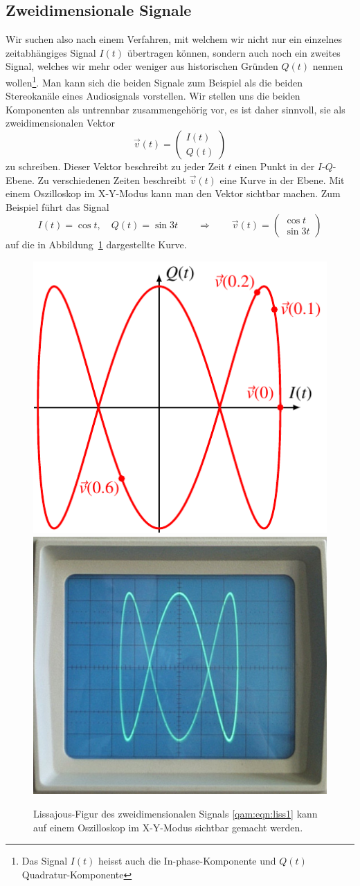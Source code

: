 %
%
%
\subsection{Zweidimensionale Signale
\label{subsection:qam:zweidimensional}}
Wir suchen also nach einem Verfahren, mit welchem wir nicht nur
ein einzelnes zeitabhängiges Signal $I(t)$ übertragen können, sondern
auch noch ein zweites Signal, welches wir mehr oder weniger aus
historischen Gründen $Q(t)$ nennen wollen\footnote{Das Signal $I(t)$
heisst auch die In-phase-Komponente und $Q(t)$ Quadratur-Komponente}.
Man kann sich die beiden Signale zum Beispiel als die beiden
Stereokanäle eines Audiosignals vorstellen.
Wir stellen uns die beiden Komponenten als untrennbar zusammengehörig
vor, es ist daher sinnvoll, sie als zweidimensionalen Vektor
\[
\vec{v}(t)
=
\begin{pmatrix}I(t)\\Q(t)\end{pmatrix}
\]
zu schreiben.
Dieser Vektor beschreibt zu jeder Zeit $t$ einen Punkt in der
$I$-$Q$-Ebene.
Zu verschiedenen Zeiten beschreibt $\vec{v}(t)$ eine Kurve
in der Ebene.
Mit einem Oszilloskop im X-Y-Modus kann man den Vektor
sichtbar machen.
Zum Beispiel führt das Signal
\begin{equation}
I(t) = \cos t,\quad
Q(t) = \sin 3t
\qquad
\Rightarrow
\qquad
\vec{v}(t)
=
\begin{pmatrix}
\cos t\\
\sin 3t
\end{pmatrix}
\label{qam:eqn:liss1}
\end{equation}
auf die in Abbildung~\ref{figure:qam:lissajous} dargestellte Kurve.
\begin{figure}
\centering
\includegraphics[width=0.48\hsize]{applications/qam/images/lissajous.pdf}
\includegraphics[width=0.48\hsize]{applications/qam/images/lissajous.jpg}
\caption{Lissajous-Figur des zweidimensionalen Signals
\eqref{qam:eqn:liss1} kann auf einem Oszilloskop im X-Y-Modus
sichtbar gemacht werden.
\label{figure:qam:lissajous}}
\end{figure}
